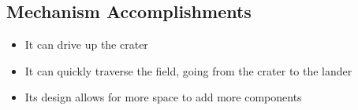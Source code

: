 \subsection*{Mechanism Accomplishments}
\begin{itemize}
    \item It can drive up the crater
    \item It can quickly traverse the field, going from the crater to the lander
    \item Its design allows for more space to add more components
\end{itemize} 

